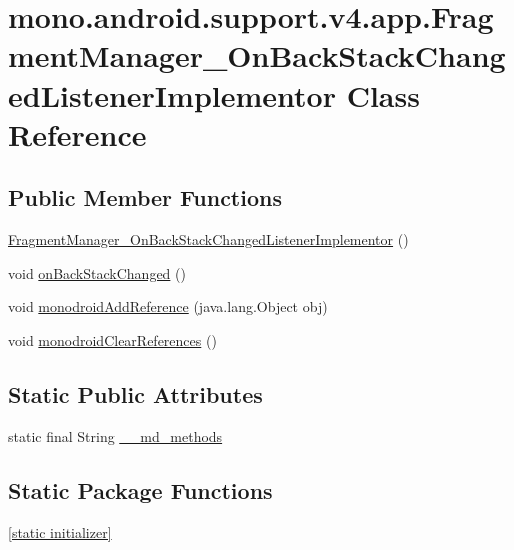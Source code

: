 \hypertarget{classmono_1_1android_1_1support_1_1v4_1_1app_1_1_fragment_manager___on_back_stack_changed_listener_implementor}{
\section{mono.android.support.v4.app.FragmentManager\_\-OnBackStackChangedListenerImplementor Class Reference}
\label{classmono_1_1android_1_1support_1_1v4_1_1app_1_1_fragment_manager___on_back_stack_changed_listener_implementor}
}
\subsection*{Public Member Functions}
\begin{CompactItemize}
\item 
\hyperlink{classmono_1_1android_1_1support_1_1v4_1_1app_1_1_fragment_manager___on_back_stack_changed_listener_implementor_9688c97747d6cc39641cd3299ec3b5ec}{FragmentManager\_\-OnBackStackChangedListenerImplementor} ()
\item 
void \hyperlink{classmono_1_1android_1_1support_1_1v4_1_1app_1_1_fragment_manager___on_back_stack_changed_listener_implementor_ac1b73d05317d86e387f0387b87775df}{onBackStackChanged} ()
\item 
void \hyperlink{classmono_1_1android_1_1support_1_1v4_1_1app_1_1_fragment_manager___on_back_stack_changed_listener_implementor_685912956810c558e72f6494db349d6e}{monodroidAddReference} (java.lang.Object obj)
\item 
void \hyperlink{classmono_1_1android_1_1support_1_1v4_1_1app_1_1_fragment_manager___on_back_stack_changed_listener_implementor_4272051b3b8101262d9ec7d0aedcc515}{monodroidClearReferences} ()
\end{CompactItemize}
\subsection*{Static Public Attributes}
\begin{CompactItemize}
\item 
static final String \hyperlink{classmono_1_1android_1_1support_1_1v4_1_1app_1_1_fragment_manager___on_back_stack_changed_listener_implementor_e3a9121b1e65698984587cc5620a10b7}{\_\-\_\-md\_\-methods}
\end{CompactItemize}
\subsection*{Static Package Functions}
\begin{CompactItemize}
\item 
\hyperlink{classmono_1_1android_1_1support_1_1v4_1_1app_1_1_fragment_manager___on_back_stack_changed_listener_implementor_be6af798651462d731c1b7b721f2ae9a}{\mbox{[}static initializer\mbox{]}}
\end{CompactItemize}
